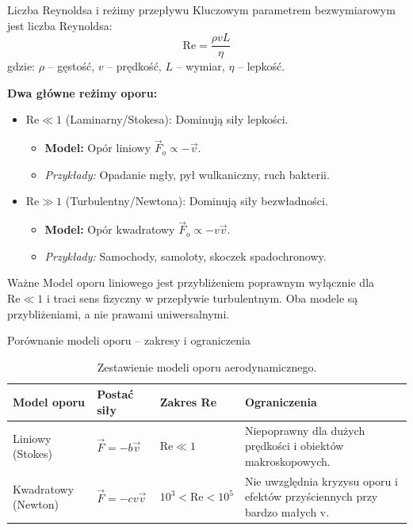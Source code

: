 \documentclass[10pt, aspectratio=43]{beamer}
\begin{document}
\begin{frame}{Liczba Reynoldsa i reżimy przepływu}
    Kluczowym parametrem bezwymiarowym jest liczba Reynoldsa:
    \begin{equation}
        \mathrm{Re} = \frac{\rho v L}{\eta}
    \end{equation}
    gdzie: $\rho$ -- gęstość, $v$ -- prędkość, $L$ -- wymiar, $\eta$ -- lepkość.

    \textbf{Dwa główne reżimy oporu:}
    \begin{itemize}
        \item $\mathrm{Re} \ll 1$ (Laminarny/Stokesa): Dominują siły lepkości.
        \begin{itemize}
            \item \textbf{Model:} Opór liniowy $\vec{F}_o \propto -\vec{v}$.
            \item \textit{Przykłady:} Opadanie mgły, pył wulkaniczny, ruch bakterii.
        \end{itemize}
        \item $\mathrm{Re} \gg 1$ (Turbulentny/Newtona): Dominują siły bezwładności.
        \begin{itemize}
            \item \textbf{Model:} Opór kwadratowy $\vec{F}_o \propto -v\vec{v}$.
            \item \textit{Przykłady:} Samochody, samoloty, skoczek spadochronowy.
        \end{itemize}
    \end{itemize}

    \begin{alertblock}{Ważne}
        Model oporu liniowego jest przybliżeniem poprawnym wyłącznie dla $\mathrm{Re} \ll 1$ i traci sens fizyczny w przepływie turbulentnym. Oba modele są przybliżeniami, a nie prawami uniwersalnymi.
    \end{alertblock}
\end{frame}

\begin{frame}{Porównanie modeli oporu – zakresy i ograniczenia}
    \begin{table}
        \centering
        \small
        \begin{tabular}{|p{}|p{}|p{}|p{}|}
            \hline
            \textbf{Model oporu} & \textbf{Postać siły} & \textbf{Zakres Re} & \textbf{Ograniczenia} \\
            \hline
            Liniowy (Stokes) & $\vec{F} = -b\vec{v}$ & $\mathrm{Re} \ll 1$ & Niepoprawny dla dużych prędkości i obiektów makroskopowych. \\
            \hline
            Kwadratowy (Newton) & $\vec{F} = -cv\vec{v}$ & $10^3 < \mathrm{Re} < 10^5$ & Nie uwzględnia kryzysu oporu i efektów przyściennych przy bardzo małych v. \\
            \hline
        \end{tabular}
        \caption{Zestawienie modeli oporu aerodynamicznego.}
    \end{table}
\end{frame}
\end{document}
